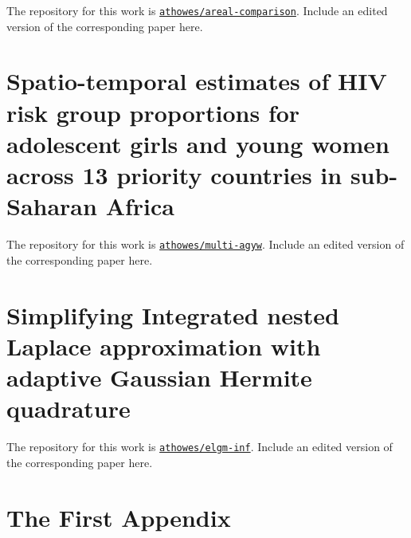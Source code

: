 \documentclass[a4paper, nobind]{templates/ociamthesis}
\begin{document}
The repository for this work is \href{https://github.com/athowes/areal-comparison}{\texttt{athowes/areal-comparison}}.
Include an edited version of the corresponding paper here.

\hypertarget{spatio-temporal-estimates-of-hiv-risk-group-proportions-for-adolescent-girls-and-young-women-across-13-priority-countries-in-sub-saharan-africa}{%
\chapter*{Spatio-temporal estimates of HIV risk group proportions for adolescent girls and young women across 13 priority countries in sub-Saharan Africa}\label{spatio-temporal-estimates-of-hiv-risk-group-proportions-for-adolescent-girls-and-young-women-across-13-priority-countries-in-sub-saharan-africa}}

\adjustmtc
{}

The repository for this work is \href{https://github.com/athowes/multi-agyw}{\texttt{athowes/multi-agyw}}.
Include an edited version of the corresponding paper here.

\hypertarget{simplifying-integrated-nested-laplace-approximation-with-adaptive-gaussian-hermite-quadrature}{%
\chapter*{Simplifying Integrated nested Laplace approximation with adaptive Gaussian Hermite quadrature}\label{simplifying-integrated-nested-laplace-approximation-with-adaptive-gaussian-hermite-quadrature}}

\adjustmtc
{}

The repository for this work is \href{https://github.com/athowes/elgm-inf}{\texttt{athowes/elgm-inf}}.
Include an edited version of the corresponding paper here.

\startappendices

\hypertarget{the-first-appendix}{%
\chapter{The First Appendix}\label{the-first-appendix}}
\end{document}
